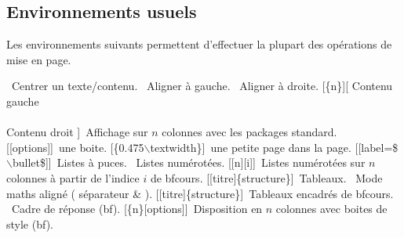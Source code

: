 \subsection{Environnements usuels}

\begin{Methode}
    Les environnements suivants permettent d'effectuer la plupart des opérations de mise en page.
    \begin{tcbenumerate}[2]
        \tcbitem  {}\ Centrer un texte/contenu.
        \tcbitem  {}\ Aligner à gauche.
        \tcbitem  {}\ Aligner à droite.
        \tcbitem  {}[\{n\}][
            Contenu gauche\\
            \\
            Contenu droit
        ]\ Affichage sur $n$ colonnes avec les packages standard.
        \tcbitem  {}[[options]]\ une boite.
        \tcbitem  {}[\{0.475$\backslash$textwidth\}]\ une petite page dans la page.
        \tcbitem  {}[[label=\$ $\backslash$bullet\$]]\ Listes à puces.
        \tcbitem  {}\ Listes numérotées.
        \tcbitem  {}[[n][i]]\ Listes numérotées sur $n$ colonnes à partir de l'indice $i$ de bfcours.
        \tcbitem  {}[[titre]\{structure\}]\ Tableaux.
        \tcbitem  {}\ Mode maths aligné ( séparateur \& ).
        \tcbitem  {}[[titre]\{structure\}]\  Tableaux encadrés de bfcours.
        \tcbitem  {}\ Cadre de réponse (bf).
        \tcbitem  {}[\{n\}[options]]\ Disposition en $n$ colonnes avec boites de style  (bf).
    \end{tcbenumerate}
\end{Methode}

\newpage

